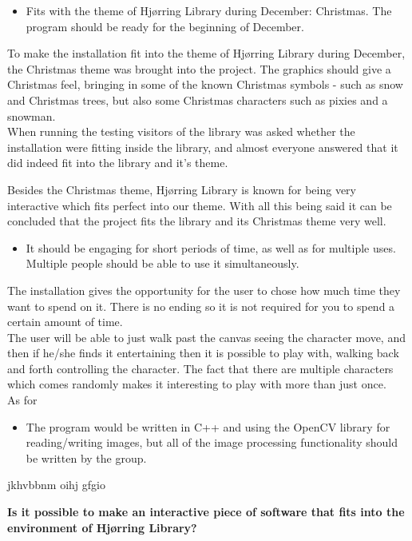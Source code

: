 \begin{itemize}
\item Fits with the theme of Hj{\o}rring Library during December: Christmas. The program should be ready for the beginning of December.
\end{itemize}
To make the installation fit into the theme of Hj{\o}rring Library during December, the Christmas theme was brought into the project. The graphics should give a Christmas feel, bringing in some of the known Christmas symbols - such as snow and Christmas trees, but also some Christmas characters such as pixies and a snowman.\\
When running the testing visitors of the library was asked whether the installation were fitting inside the library, and almost everyone answered that it did indeed fit into the library and it's theme.

Besides the Christmas theme, Hj{\o}rring Library is known for being very interactive which fits perfect into our theme. With all this being said it can be concluded that the project fits the library and its Christmas theme very well.

\begin{itemize}
\item It should be engaging for short periods of time, as well as for multiple uses. Multiple people should be able to use it simultaneously.
\end{itemize}
The installation gives the opportunity for the user to chose how much time they want to spend on it. There is no ending so it is not required for you to spend a certain amount of time. \\
The user will be able to just walk past the canvas seeing the character move, and then if he/she finds it entertaining then it is possible to play with, walking back and forth controlling the character. The fact that there are multiple characters which comes randomly makes it interesting to play with more than just once.\\
As for 

\begin{itemize}
\item The program would be written in C++ and using the OpenCV library for reading/writing images, but all of the image processing functionality should be written by the group.
\end{itemize}
jkhvbbnm oihj gfgio

\textbf{Is it possible to make an interactive piece of software that fits into the environment of Hj{\o}rring Library?}

